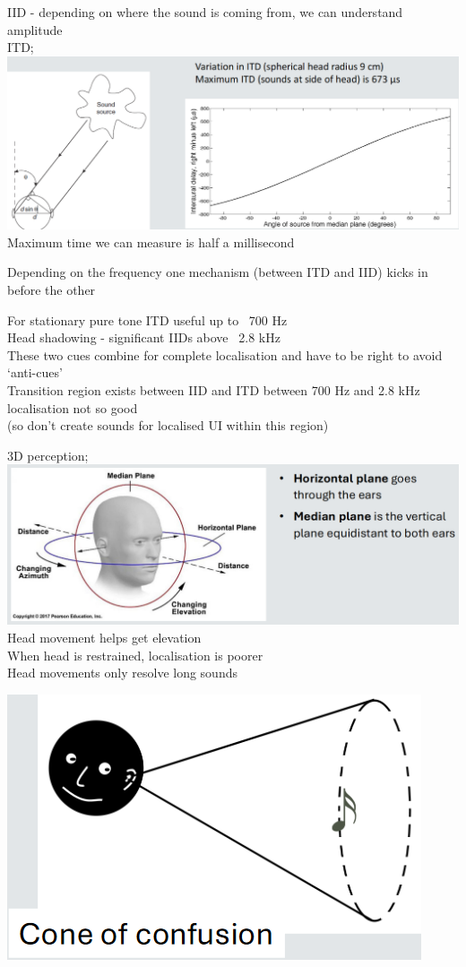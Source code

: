 \documentclass[]{project_plan}
\begin{document}
\newpage

IID - depending on where the sound is coming from, we can understand amplitude\\
ITD;\\
\includegraphics[width=\linewidth]{head_shadow_effect_itd.png}
Maximum time we can measure is half a millisecond

Depending on the frequency one mechanism (between ITD and IID) kicks in before the other

For stationary pure tone ITD useful up to ~700 Hz\\
Head shadowing - significant IIDs above ~2.8 kHz\\
These two cues combine for complete localisation and have to be right to avoid ‘anti-cues’\\
Transition region exists between IID and ITD between 700 Hz and 2.8 kHz localisation not so good\\
(so don't create sounds for localised UI within this region)

3D perception;\\
\includegraphics[width=\linewidth]{3d_perception_of_sound.png}
Head movement helps get elevation\\
When head is restrained, localisation is poorer\\
Head movements only resolve long sounds

\newpage

\includegraphics[width=0.5\linewidth]{sound_cone_of_confusion.png}
\end{document}

